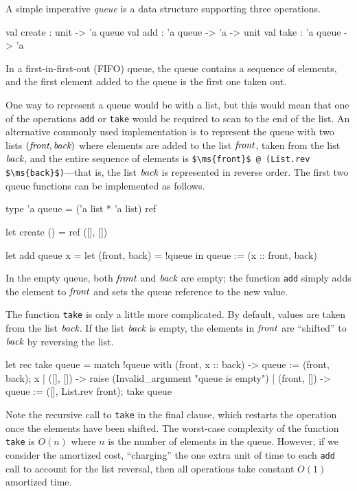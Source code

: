 
A simple imperative \emph{queue} is a data structure supporting three operations.

\begin{ocaml}
val create : unit -> 'a queue
val add    : 'a queue -> 'a -> unit
val take   : 'a queue -> 'a
\end{ocaml}
%
In a first-in-first-out (FIFO) queue, the queue contains a sequence of elements, and the
first element added to the queue is the first one taken out.

One way to represent a queue would be with a list, but this would mean that one of the
operations \hbox{\lstinline/add/} or \hbox{\lstinline/take/} would be required to scan to the end of the list.  An
alternative commonly used implementation is to represent the queue with two lists
$(\textit{front}, \textit{back})$ where elements are added to the list $\textit{front}$, taken from the list
$\textit{back}$, and the entire sequence of elements is
%
\hbox{\lstinline/$\ms{front}$ @ (List.rev $\ms{back}$)/}---that is,
the list $\textit{back}$ is represented in reverse order.  The first two queue functions can be
implemented as follows.

\begin{ocaml}
type 'a queue = ('a list * 'a list) ref

let create () =
   ref ([], [])

let add queue x =
   let (front, back) = !queue in
   queue := (x :: front, back)
\end{ocaml}
%
In the empty queue, both $\textit{front}$ and $\textit{back}$ are empty; the function \hbox{\lstinline/add/} simply
adds the element to $\textit{front}$ and sets the queue reference to the new value.

The function \hbox{\lstinline/take/} is only a little more complicated.  By default, values are taken from
the list $\textit{back}$.  If the list $\textit{back}$ is empty, the elements in $\textit{front}$ are
``shifted'' to $\textit{back}$ by reversing the list.

\begin{ocaml}
let rec take queue =
   match !queue with
      (front, x :: back) ->
          queue := (front, back);
          x
    | ([], []) ->
          raise (Invalid_argument "queue is empty")
    | (front, []) ->
          queue := ([], List.rev front);
          take queue
\end{ocaml}
%
Note the recursive call to \hbox{\lstinline/take/} in the final clause, which restarts the operation once
the elements have been shifted.  The worst-case complexity of the function \hbox{\lstinline/take/} is
$O(n)$ where $n$ is the number of elements in the queue.  However, if we consider the amortized
cost, ``charging'' the one extra unit of time to each \hbox{\lstinline/add/} call to account for the
list reversal, then all operations take constant $O(1)$ amortized time.

